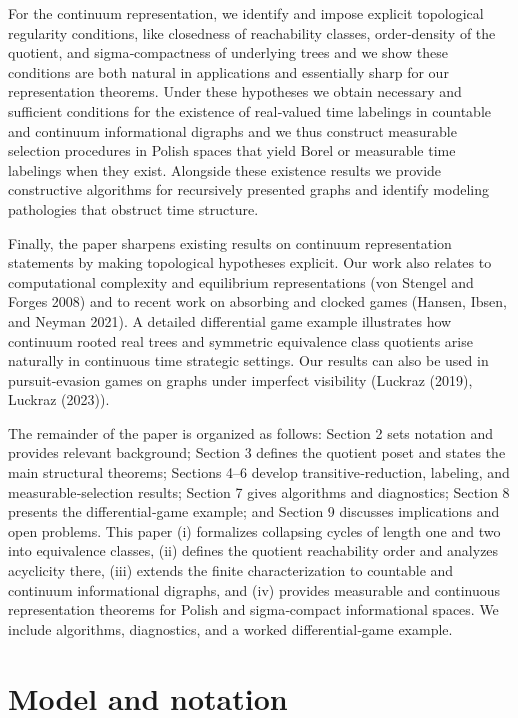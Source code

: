 \documentclass[11pt]{article}
\begin{document}
For the continuum representation, we identify and impose explicit topological regularity conditions, like closedness of reachability classes, order‑density of the quotient, and sigma‑compactness of underlying trees and we show these conditions are both natural in applications and essentially sharp for our representation theorems. Under these hypotheses we obtain necessary and sufficient conditions for the existence of real‑valued time labelings in countable and continuum informational digraphs and we thus construct measurable selection procedures in Polish spaces that yield Borel or measurable time labelings when they exist. Alongside these existence results we provide constructive algorithms for recursively presented graphs and identify modeling pathologies that obstruct time structure.

Finally, the paper sharpens existing results on continuum representation statements by making topological hypotheses explicit. Our work also relates to computational complexity and equilibrium representations (von Stengel and Forges 2008) and to recent work on absorbing and clocked games (Hansen, Ibsen, and Neyman 2021). A detailed differential game example illustrates how continuum rooted real trees and symmetric equivalence class quotients arise naturally in continuous time strategic settings. 	Our results can also be used in pursuit-evasion games on graphs under imperfect visibility (Luckraz (2019), Luckraz (2023)).


The remainder of the paper is organized as follows: Section 2 sets notation and provides relevant background; Section 3 defines the quotient poset and states the main structural theorems; Sections 4–6 develop transitive‑reduction, labeling, and measurable‑selection results; Section 7 gives algorithms and diagnostics; Section 8 presents the differential‑game example; and Section 9 discusses implications and open problems.
This paper (i) formalizes collapsing cycles of length one and two into
equivalence classes, (ii) defines the quotient reachability order and
analyzes acyclicity there, (iii) extends the finite characterization to
countable and continuum informational digraphs, and (iv) provides
measurable and continuous representation theorems for Polish and
sigma‑compact informational spaces. We include algorithms, diagnostics,
and a worked differential‑game example.


\section{Model and notation}
\end{document}

